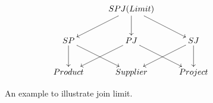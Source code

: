 \begin{figure}\centering\[\xymatrix{&*+{SPJ (Limit)} \ar[dl] \ar[d] \ar[dr] \\SP \ar[dr] \ar[d]  & PJ  \ar[dl] \ar[dr] & SJ  \ar[d] \ar[dl]  \\  Product & Supplier & Project}\]
\caption{An example to illustrate join limit.} \label{fig:SPJJoin}
\end{figure}













